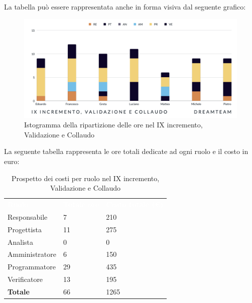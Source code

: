 La tabella può essere rappresentata anche in forma visiva dal seguente grafico:
\begin{figure}[H]
\centering
\includegraphics[scale=0.55]{Sezioni/SezioniPreventivo/grafici/Preventivo_validazione_collaudo_IX.png}
\caption{Istogramma della ripartizione delle ore nel IX incremento, Validazione e Collaudo}
\end{figure}

La seguente tabella rappresenta le ore totali dedicate ad ogni ruolo e il costo in euro:

\begin{table}[H]
\begin{center}
\renewcommand{\arraystretch}{1.5}
\begin{tabular}{ m{}<{\centering}  m{}<{\centering} m{}<{\centering}}
	\rowcolor{darkblue}
	\textcolor{white}{\textbf{Ruolo}}&\textcolor{white}{\textbf{Totale ore}}&\textcolor{white}{\textbf{Costo totale (\euro)}}\\ 

	Responsabile  & 7 & 210 \\	
	
	Progettista & 11 & 275 \\
	
	Analista & 0 & 0 \\

	Amministratore & 6 & 150 \\
	
	Programmatore & 29 & 435 \\
	
	Verificatore & 13 & 195 \\
	
	\textbf{Totale} & 66 & 1265 \\
	
\end{tabular}
\caption{Prospetto dei costi per ruolo nel IX incremento, Validazione e Collaudo}
\end{center}
\end{table}

